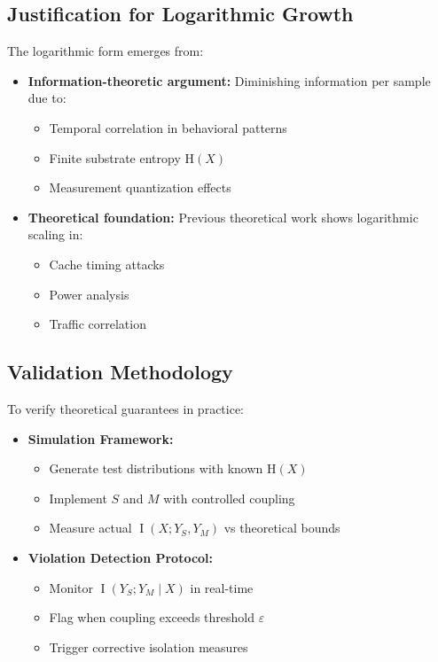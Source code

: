 \documentclass[11pt,a4paper]{article}
\theoremstyle{definition}
\DeclareMathOperator{\I}{I}
\newcommand{\Entropy}{\mathrm{H}}
\newcommand{\given}{\mid}
\begin{document}
\subsection{Justification for Logarithmic Growth}

The logarithmic form emerges from:

\begin{itemize}
    \item \textbf{Information-theoretic argument:} Diminishing information per sample due to:
    \begin{itemize}
        \item Temporal correlation in behavioral patterns
        \item Finite substrate entropy $\Entropy(X)$
        \item Measurement quantization effects
    \end{itemize}
    \item \textbf{Theoretical foundation:} Previous theoretical work shows logarithmic scaling in:
    \begin{itemize}
        \item Cache timing attacks \cite{yarom2014}
        \item Power analysis \cite{mangard2007}
        \item Traffic correlation \cite{murdoch2005}
    \end{itemize}
\end{itemize}

\subsection{Validation Methodology}

To verify theoretical guarantees in practice:

\begin{itemize}
    \item \textbf{Simulation Framework:}
    \begin{itemize}
        \item Generate test distributions with known $\Entropy(X)$
        \item Implement $S$ and $M$ with controlled coupling
        \item Measure actual $\I(X; Y_S, Y_M)$ vs theoretical bounds
    \end{itemize}
    \item \textbf{Violation Detection Protocol:}
    \begin{itemize}
        \item Monitor $\I(Y_S; Y_M \given X)$ in real-time
        \item Flag when coupling exceeds threshold $\varepsilon$
        \item Trigger corrective isolation measures
    \end{itemize}
\end{itemize}
\end{document}
